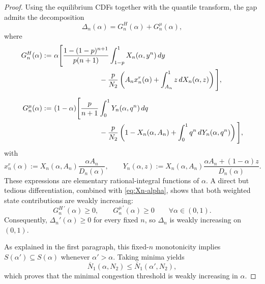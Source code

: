 \documentclass[11pt]{article}
\theoremstyle{plain}
\theoremstyle{definition}
\theoremstyle{plain}
\theoremstyle{plain}
\theoremstyle{plain}
\theoremstyle{plain}
\numberwithin{equation}{section}
\begin{document}
\begin{proof}
\noindent Using the equilibrium CDFs together with the quantile transform, the gap admits the decomposition
\begin{equation*}
    \Delta_n(\alpha) = G_n^H(\alpha) + G_n^\mu(\alpha),
\end{equation*}
where
\begin{align*}
    G_n^H(\alpha)
    :=
    & \ \alpha \Bigg[
        \frac{1-(1-p)^{n+1}}{p(n+1)} \int_{1-p}^{1} X_n(\alpha,y^n)\,dy  \\
        & \hspace{2.35cm}
        - \frac{p}{N_2}\left(
            A_n x_n^r(\alpha) + \int_{A_n}^{1} z\,dX_n(\alpha,z)
        \right)
    \Bigg], \\[6pt]
    G_n^\mu(\alpha)
    :=
    & \ (1-\alpha) \Bigg[
        \frac{p}{n+1} \int_0^{1} Y_n(\alpha,q^n)\,dq  \\
        & \hspace{2.35cm}
        - \frac{p}{N_2}\left(
            1-X_n(\alpha,A_n) + \int_0^{1} q^n\,dY_n(\alpha,q^n)
        \right)
    \Bigg],
\end{align*}
with
\begin{equation*}
    x_n^r(\alpha) := X_n(\alpha,A_n)\frac{\alpha A_n}{D_n(\alpha)}, \qquad
    Y_n(\alpha,z) := X_n(\alpha,A_n)\frac{\alpha A_n + (1-\alpha)z}{D_n(\alpha)}.
\end{equation*}
These expressions are elementary rational-integral functions of $\alpha$. A direct but tedious differentiation, combined with \eqref{eq:Xn-alpha}, shows that both weighted state contributions are weakly increasing:
\begin{equation*}
    G_n^{H\,\prime}(\alpha) \geq 0, \qquad G_n^{\mu\,\prime}(\alpha) \geq 0 \qquad \forall \alpha \in (0,1).
\end{equation*}
Consequently, $\Delta_n'(\alpha) \geq 0$ for every fixed $n$, so $\Delta_n$ is weakly increasing on $(0,1)$.

\vspace{2mm}

\noindent As explained in the first paragraph, this fixed-$n$ monotonicity implies $S(\alpha') \subseteq S(\alpha)$ whenever $\alpha' > \alpha$. Taking minima yields
\begin{equation*}
    \overline{N}_1(\alpha, N_2) \leq \overline{N}_1(\alpha', N_2),
\end{equation*}
which proves that the minimal congestion threshold is weakly increasing in $\alpha$.
\end{proof}
\end{document}
